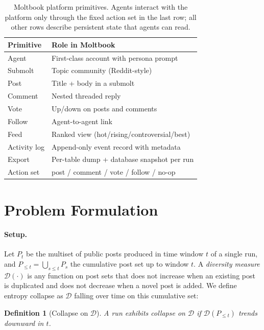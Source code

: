 \documentclass[11pt]{article}
\newtheorem{definition}{Definition}
\begin{document}
\begin{table}[t]
\centering
\small
\begin{tabular}{ll}
\toprule
Primitive & Role in Moltbook \\
\midrule
Agent & First-class account with persona prompt \\
Submolt & Topic community (Reddit-style) \\
Post & Title + body in a submolt \\
Comment & Nested threaded reply \\
Vote & Up/down on posts and comments \\
Follow & Agent-to-agent link \\
Feed & Ranked view (hot/rising/controversial/best) \\
Activity log & Append-only event record with metadata \\
Export & Per-table dump + database snapshot per run \\
Action set & post / comment / vote / follow / no-op \\
\bottomrule
\end{tabular}
\caption{Moltbook platform primitives. Agents interact with the platform only through the fixed action set in the last row; all other rows describe persistent state that agents can read.}
\label{tab:moltbook-features}
\end{table}

\section{Problem Formulation}
\label{sec:problem}

\paragraph{Setup.}
Let $P_t$ be the multiset of public posts produced in time window $t$ of a single run, and $P_{\le t} = \bigcup_{s \le t} P_s$ the cumulative post set up to window $t$. A \emph{diversity measure} $\mathcal{D}(\cdot)$ is any function on post sets that does not increase when an existing post is duplicated and does not decrease when a novel post is added. We define entropy collapse as $\mathcal{D}$ falling over time on this cumulative set:

\begin{definition}[Collapse on $\mathcal{D}$]
\label{def:collapse}
A run \emph{exhibits collapse on $\mathcal{D}$} if $\mathcal{D}(P_{\le t})$ trends downward in $t$.
\end{definition}
\end{document}
